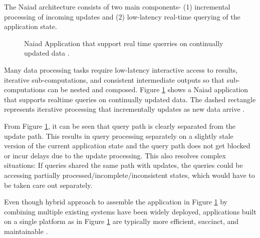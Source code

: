 \documentclass[9pt,twocolumn,twoside]{../../styles/osajnl}
\begin{document}
The Naiad architecture consists of two main components- (1)
incremental processing of incoming updates and (2) low-latency
real-time querying of the application state.
\begin{figure}[htbp]
\centering
{}
\caption{Naiad Application that support real time querries on
  continually updated data \cite{paper1-Naiad}.}
\label{Naiad-arch}
\end{figure}

Many data processing tasks require low-latency interactive access to
results, iterative sub-computations, and consistent intermediate
outputs so that sub-computations can be nested and composed.  Figure
\ref{Naiad-arch} shows a Naiad application that supports realtime
queries on continually updated data. The dashed rectangle represents
iterative processing that incrementally updates as new data arrive
\cite{paper1-Naiad}.

From Figure \ref{Naiad-arch}, it can be seen that query path is
clearly separated from the update path. This results in query
processing separately on a slightly stale version of the current
application state and the query path does not get blocked or incur
delays due to the update processing. This also resolves complex
situations: If queries shared the same path with updates, the queries
could be accessing partially processed/incomplete/inconsistent states,
which would have to be taken care out separately.

Even though hybrid approach to assemble the application in Figure
\ref{Naiad-arch} by combining multiple existing systems have been
widely deployed, applications built on a single platform as in Figure
\ref{Naiad-arch} are typically more efficient, succinct, and
maintainable \cite{paper1-Naiad}.
\end{document}
